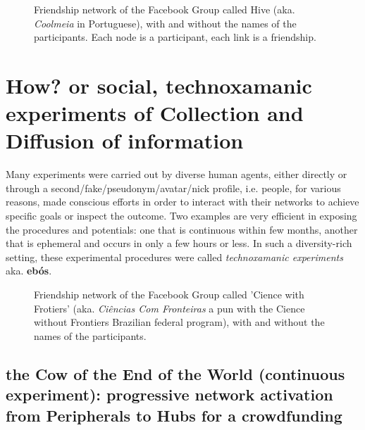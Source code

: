 \documentclass[a4paper]{article}
\begin{document}
\begin{figure}[!h]
  \centering
  \caption{Friendship network of the Facebook Group called Hive (aka. \emph{Coolmeia} in Portuguese), with and without the names of the participants. Each node is a participant, each link is a friendship.}
\end{figure}

\section{How? or social, technoxamanic experiments of Collection and Diffusion of information}
Many experiments were carried out by diverse human agents, either directly or
through a second/fake/pseudonym/avatar/nick profile, i.e. people, for various
reasons, made conscious efforts in order to interact with their networks to
achieve specific goals or inspect the outcome.  Two examples are very efficient
in exposing the procedures and potentials: one that is continuous within few
months, another that is ephemeral and occurs in only a few hours or less.  In such
a diversity-rich setting, these experimental procedures were called
\emph{technoxamanic experiments} aka.  {\bf ebós}.

\begin{figure}[!h]
  \centering
  \caption{Friendship network of the Facebook Group called 'Cience with Frotiers' (aka. \emph{Ciências Com Fronteiras} a pun with the Cience without Frontiers Brazilian federal program), with and without the names of the participants.}
\end{figure}



\subsection{the Cow of the End of the World (continuous experiment):
progressive network activation from Peripherals to Hubs for a crowdfunding}\label{cont}
\end{document}
